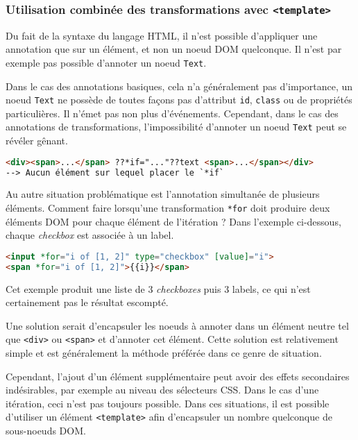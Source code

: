 \subsubsection{Utilisation combinée des transformations avec \texttt{<template>}}
Du fait de la syntaxe du langage HTML, il n'est possible d'appliquer une annotation que sur un élément, et non un noeud DOM quelconque. Il n'est par exemple pas possible d'annoter un noeud \texttt{Text}.

Dans le cas des annotations basiques, cela n'a généralement pas d'importance, un noeud \texttt{Text} ne possède de toutes façons pas d'attribut \texttt{id}, \texttt{class} ou de propriétés particulières. Il n'émet pas non plus d'événements. Cependant, dans le cas des annotations de transformations, l'impossibilité d'annoter un noeud \texttt{Text} peut se révéler gênant.

\begin{lstlisting}[language=HTML]
<div><span>...</span> ??*if="..."??text <span>...</span></div>
--> Aucun élément sur lequel placer le `*if`
\end{lstlisting}

Au autre situation problématique est l'annotation simultanée de plusieurs éléments. Comment faire lorsqu'une transformation \texttt{*for} doit produire deux éléments DOM pour chaque élément de l'itération ? Dans l'exemple ci-dessous, chaque \emph{checkbox} est associée à un label.

\begin{lstlisting}[language=HTML]
<input *for="i of [1, 2]" type="checkbox" [value]="i">
<span *for="i of [1, 2]">{{i}}</span>
\end{lstlisting}

Cet exemple produit une liste de 3 \emph{checkboxes} puis 3 labels, ce qui n'est certainement pas le résultat escompté.

Une solution serait d'encapsuler les noeuds à annoter dans un élément neutre tel que \texttt{<div>} ou \texttt{<span>} et d'annoter cet élément. Cette solution est relativement simple et est généralement la méthode préférée dans ce genre de situation.

Cependant, l'ajout d'un élément supplémentaire peut avoir des effets secondaires indésirables, par exemple au niveau des sélecteurs CSS. Dans le cas d'une itération, ceci n'est pas toujours possible. Dans ces situations, il est possible d'utiliser un élément \texttt{<template>} afin d'encapsuler un nombre quelconque de sous-noeuds DOM.

